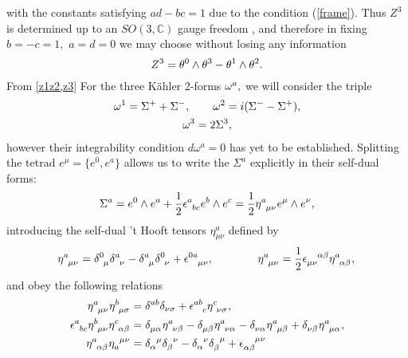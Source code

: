 \documentclass[a4paper,12pt, onecolumn, notitlepage]{article}
\theoremstyle{definition}
\theoremstyle{remark}
\newcommand{\al}{\alpha}
\newcommand{\w}{\omega}
\newcommand{\m}{\mu}
\newcommand{\n}{\nu}
\newcommand{\e}{\epsilon}
\newcommand{\K}{K\"ahler }
\newcommand{\hooft}[3]{\eta\indices{^{#1}_{#2}_{#3}}}
\begin{document}
with the constants satisfying $ad-bc=1$ due to the condition (\ref{frame}). Thus $Z^{3}$ is determined up to an $SO(3,\mathbb{C})$ gauge freedom \cite{plebanski_1975}, and therefore in fixing $b=-c=1,$ $a=d=0$ we may choose without losing any information
\begin{equation}
\label{z3}
	Z\indices{^3}=\theta\indices{^0}\wedge\theta\indices{^3} - \theta\indices{^1}\wedge\theta\indices{^2}.
\end{equation}
From \cref{z1z2,z3} 
For the three \K 2-forms $\w\indices{^a},$ we will consider the triple
\begin{gather*}
	\w\indices{^1} = \Sigma\indices{^+}+\Sigma\indices{^-},\qquad \w\indices{^2}= i(\Sigma\indices{^-}-\Sigma\indices{^+}),\\\w\indices{^3} = 2\Sigma\indices{^3},
\end{gather*}
however their integrability condition $d\w^{a}=0$ has yet to be established. Splitting the tetrad $e^{\m}=\{e^{0},e^{a}\}$ allows us to write the $\Sigma^{a}$ explicitly in their self-dual forms:
\begin{equation}
\label{sd_form}
\Sigma^{a} = e^{0}\wedge e^{a} + \frac{1}{2}\e\indices{^a_b_c}e^{b}\wedge e^{c} = \frac{1}{2}\hooft{a}{\mu}{\n}e\indices{^\mu}\wedge e\indices{^\nu},
\end{equation}
introducing the self-dual 't Hooft tensors $\eta^{a}_{\mu \nu}$ defined by
\begin{equation}
	\label{hooft1}
	\hooft{a}{\m}{\n} =  \delta\indices{^0_\mu}\delta\indices{^a_\nu} - \delta\indices{^a_\mu}\delta\indices{^0_\nu} + \epsilon\indices{^0^a_\mu_\nu},\qquad\qquad\hooft{a}{\m}{\n}=\frac{1}{2}\e\indices{_\m_\n^\al^\beta}\hooft{a}{\al}{\beta},\\
\end{equation}
and obey the following relations
\begin{subequations}
	\begin{align}
	\label{hooft2}
	\hooft{a}{\m}{\n}\hooft{b}{\m}{\sigma} &= \delta^{ab}\delta_{\nu\sigma} + \epsilon\indices{^a^b_c}\hooft{c}{\nu}{\sigma},\\
	\label{hooft3}
	\e\indices{^a_b_c}\hooft{b}{\m}{\n}\hooft{c}{\al}{\beta}&=\delta\indices{_\m_\al}\hooft{a}{\n}{\beta}-\delta\indices{_\m_\beta}\hooft{a}{\n}{\al}-\delta\indices{_\n_\al}\hooft{a}{\m}{\beta}+\delta\indices{_\n_\beta}\hooft{a}{\m}{\al},\\
	\label{projection}
	\hooft{a}{\al}{\beta}\eta\indices{_{a}^{\mu}^{\nu}} &= \delta\indices{_\al^\mu}\delta\indices{_\beta^\nu} - \delta\indices{_\al^\nu}\delta\indices{_\beta^\mu} + \e\indices{_\al_\beta^\mu^\nu}
	\end{align}
\end{subequations}
\end{document}
